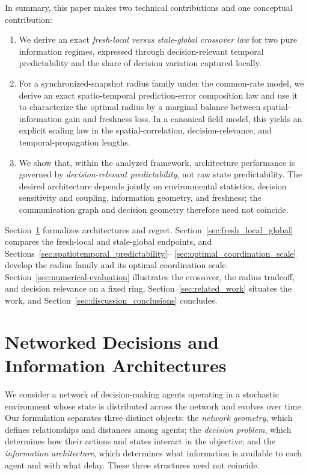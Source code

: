 \documentclass[11pt]{article}
\begin{document}
In summary, this paper makes two technical contributions and one conceptual
contribution:
\begin{enumerate}
    \item We derive an exact \emph{fresh-local versus stale-global crossover
    law} for two pure information regimes, expressed through decision-relevant
    temporal predictability and the share of decision variation captured
    locally.

    \item For a synchronized-snapshot radius family under the common-rate
    model, we derive an exact spatio-temporal prediction-error composition law
    and use it to characterize the optimal radius by a marginal balance between
    spatial-information gain and freshness loss. In a canonical field model,
    this yields an explicit scaling law in the spatial-correlation,
    decision-relevance, and temporal-propagation lengths.

    \item We show that, within the analyzed framework, architecture performance is governed by
    \emph{decision-relevant predictability}, not raw state predictability. The
    desired architecture depends jointly on environmental statistics, decision
    sensitivity and coupling, information geometry, and freshness; the
    communication graph and decision geometry therefore need not coincide.
\end{enumerate}

Section~\ref{sec:model} formalizes architectures and regret.
Section~\ref{sec:fresh_local_global} compares the fresh-local and stale-global
endpoints, and Sections~\ref{sec:spatiotemporal_predictability}--
\ref{sec:optimal_coordination_scale} develop the radius family and its optimal
coordination scale. Section~\ref{sec:numerical-evaluation} illustrates the crossover, the radius tradeoff, and decision relevance on a fixed ring, Section~\ref{sec:related_work} situates the work, and
Section~\ref{sec:discussion_conclusions} concludes.

\section{Networked Decisions and Information Architectures}
\label{sec:model}

We consider a network of decision-making agents operating in a stochastic
environment whose state is distributed across the network and evolves over
time. Our formulation separates three distinct objects: the
\emph{network geometry}, which defines relationships and distances among
agents; the \emph{decision problem}, which determines how their actions and
states interact in the objective; and the \emph{information architecture},
which determines what information is available to each agent and with what
delay. These three structures need not coincide.
\end{document}
